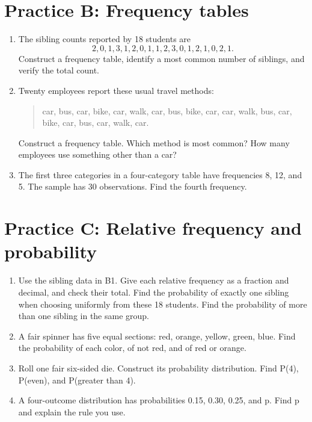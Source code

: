 \documentclass[12pt,letterpaper]{article}
\begin{document}
\section*{Practice B: Frequency tables}
\begin{enumerate}[label=B\arabic*.,leftmargin=2.5em,itemsep=10pt]
\item The sibling counts reported by 18 students are
\[2,0,1,3,1,2,0,1,1,2,3,0,1,2,1,0,2,1.\]
Construct a frequency table, identify a most common number of siblings, and verify the total count.
\item Twenty employees report these usual travel methods:
\begin{quote}car, bus, car, bike, car, walk, car, bus, bike, car, car, walk, bus, car, bike, car, bus, car, walk, car.\end{quote}
Construct a frequency table. Which method is most common? How many employees use something other than a car?
\item The first three categories in a four-category table have frequencies 8, 12, and 5. The sample has 30 observations. Find the fourth frequency.
\end{enumerate}

\section*{Practice C: Relative frequency and probability}
\begin{enumerate}[label=C\arabic*.,leftmargin=2.5em,itemsep=10pt]
\item Use the sibling data in B1. Give each relative frequency as a fraction and decimal, and check their total. Find the probability of exactly one sibling when choosing uniformly from these 18 students. Find the probability of more than one sibling in the same group.
\item A fair spinner has five equal sections: red, orange, yellow, green, blue. Find the probability of each color, of not red, and of red or orange.
\item Roll one fair six-sided die. Construct its probability distribution. Find P(4), P(even), and P(greater than 4).
\item A four-outcome distribution has probabilities 0.15, 0.30, 0.25, and p. Find p and explain the rule you use.
\end{enumerate}

\end{document}
